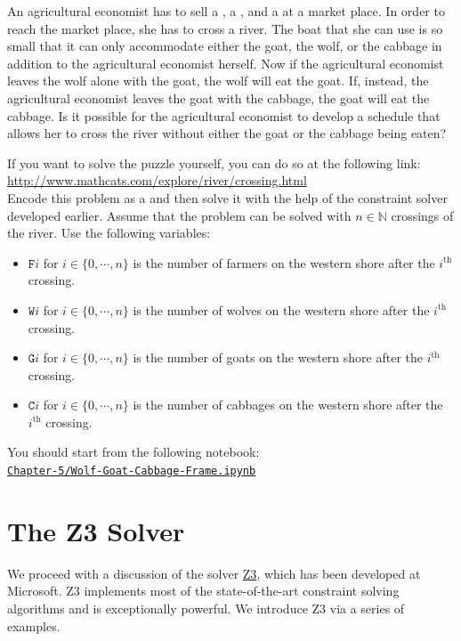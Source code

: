\exerciseEng
An agricultural economist has to sell a , a , and a 
at a market place.  In order to reach the market place, she has to cross a river.  The
boat that she can use is so small that it can only accommodate either the goat, the wolf,
or the cabbage in addition to the agricultural economist herself.  Now if the agricultural
economist leaves the wolf alone with the goat, the wolf will eat the goat.  If, instead,
the agricultural economist leaves the goat with the cabbage, the goat will eat the
cabbage.  Is it possible for the agricultural economist to develop a schedule that allows
her to cross the river without either the goat or the cabbage being eaten?

If you want to solve the puzzle yourself, you can do so at the following link:
\\[0.2cm]
\hspace*{1.3cm}
\href{http://www.mathcats.com/explore/river/crossing.html}{http://www.mathcats.com/explore/river/crossing.html}
\\[0.2cm]
Encode this problem as a  and then solve it with the help
of the constraint solver developed earlier.  Assume that the
problem can be solved with $n\in\mathbb{N}$ crossings of the river.  Use the following
variables:
\begin{itemize}
\item $\texttt{F}i$ for $i\in\{0,\cdots,n\}$ is the number of farmers on the western shore after the 
      $i^{\textrm{th}}$ crossing.
\item $\texttt{W}i$ for $i\in\{0,\cdots,n\}$ is the number of wolves on the western shore after the 
      $i^{\textrm{th}}$ crossing.
\item $\texttt{G}i$ for $i\in\{0,\cdots,n\}$ is the number of goats on the western shore after the 
      $i^{\textrm{th}}$ crossing.
\item $\texttt{C}i$ for $i\in\{0,\cdots,n\}$ is the number of cabbages on the western shore after the 
      $i^{\textrm{th}}$ crossing.
\end{itemize}
You should start from the following notebook:
\\[0.2cm]
\hspace*{1.3cm}
\href{https://github.com/karlstroetmann/Logic/blob/master/TypeScript/Chapter-5/Wolf-Goat-Cabbage-Frame.ipynb}{\texttt{Chapter-5/Wolf-Goat-Cabbage-Frame.ipynb}}
\eox

\section{The Z3 Solver}
We proceed with a discussion of the solver
\href{https://www.microsoft.com/en-us/research/project/z3-3/}{Z3}, which has been developed
at Microsoft.  Z3 implements most of the state-of-the-art constraint solving algorithms
and is exceptionally powerful.  We introduce Z3 via a series of examples.

